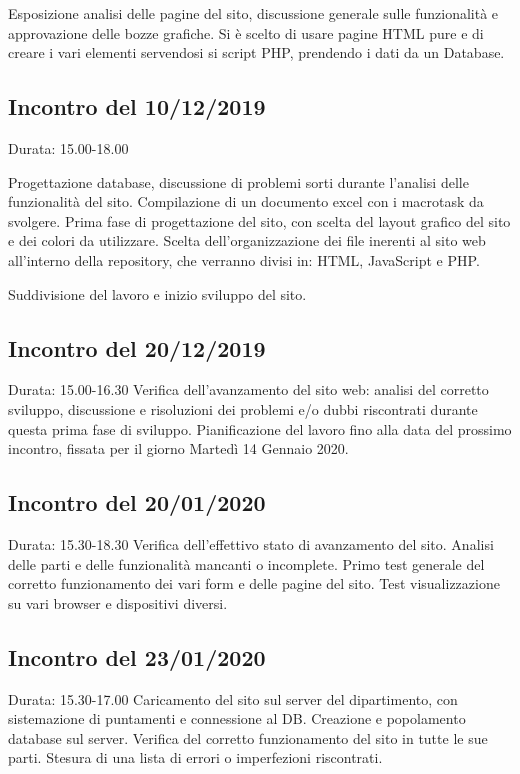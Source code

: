     Esposizione analisi delle pagine del sito, discussione generale sulle funzionalità e approvazione delle bozze grafiche.
    Si è scelto di usare pagine HTML pure e di creare i vari elementi servendosi si script PHP, prendendo i dati da un Database.

\subsection{Incontro del 10/12/2019}
    Durata: 15.00-18.00

    Progettazione database, discussione di problemi sorti durante l'analisi delle funzionalità del sito. Compilazione di un documento excel con i macrotask da svolgere.
    Prima fase di progettazione del sito, con scelta del layout grafico del sito e dei colori da utilizzare.
    Scelta dell'organizzazione dei file inerenti al sito web all'interno della repository, che verranno divisi in: HTML, JavaScript e PHP.

    Suddivisione del lavoro e inizio sviluppo del sito.

\subsection{Incontro del 20/12/2019}
    Durata: 15.00-16.30
    Verifica dell'avanzamento del sito web: analisi del corretto sviluppo, discussione e risoluzioni dei problemi e/o dubbi riscontrati durante questa prima fase di sviluppo.
    Pianificazione del lavoro fino alla data del prossimo incontro, fissata per il giorno Martedì 14 Gennaio 2020.

\subsection{Incontro del 20/01/2020}
    Durata: 15.30-18.30
    Verifica dell'effettivo stato di avanzamento del sito. Analisi delle parti e delle funzionalità mancanti o incomplete.
    Primo test generale del corretto funzionamento dei vari form e delle pagine del sito.
    Test visualizzazione su vari browser e dispositivi diversi.

\subsection{Incontro del 23/01/2020}
    Durata: 15.30-17.00
    Caricamento del sito sul server del dipartimento, con sistemazione di puntamenti e connessione al DB. Creazione e popolamento database sul server.
    Verifica del corretto funzionamento del sito in tutte le sue parti. Stesura di una lista di errori o imperfezioni riscontrati.




